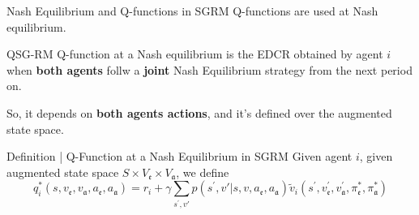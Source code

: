 \documentclass[10pt, aspectratio=169]{beamer}
\newcommand{\evidenzia}[1]{\textcolor{verdeSalvia}{\textbf{#1}}}
\begin{document}
\begin{frame}{Nash Equilibrium and Q-functions in SGRM}
    Q-functions are used at Nash equilibrium.
    
    \vspace{0.2cm}
    \begin{block}{QSG-RM}
    Q-function at a Nash equilibrium is the EDCR obtained by agent $i$ when \evidenzia{both agents} follw a \evidenzia{joint} Nash Equilibrium strategy from the next period on.
    \end{block}
    \vspace{0.2cm}
    So, it depends on \evidenzia{both agents actions}, and it's defined over the augmented state space.%

    \begin{block}{Definition | Q-Function at a Nash Equilibrium in SGRM}
        Given agent $i$, given augmented state space $S \times V_{\mathfrak{e}} \times V_{\mathfrak{a}}$, we define
        \[ q_{i}^{*}(s,v_{\mathfrak{e}},v_{\mathfrak{a}},a_{\mathfrak{e}},a_{\mathfrak{a}})=r_{i} + \gamma\sum_{s^{\prime}, v'}p(s^{\prime},v'|s,v,a_{\mathfrak{e}},a_{\mathfrak{a}})\tilde{v}_{i}(s^{\prime},v_{\mathfrak{e}}^{\prime},v_{\mathfrak{a}}^{\prime},\pi_{\mathfrak{e}}^{*},\pi_{\mathfrak{a}}^{*}) \]
    \end{block}
    
\end{frame}
\end{document}
